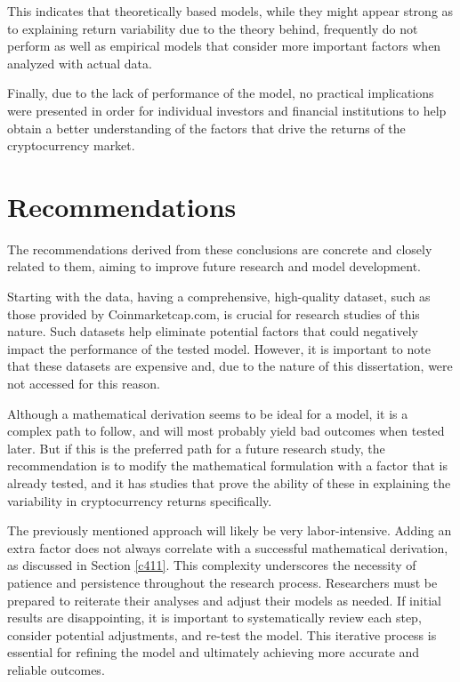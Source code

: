 This indicates that theoretically based models, while they might appear strong as to explaining return variability due to the theory behind, frequently do not perform as well as empirical models that consider more important factors when analyzed with actual data.

Finally, due to the lack of performance of the model, no practical implications were presented in order for individual investors and financial institutions to help obtain a better understanding of the factors that drive the returns of the cryptocurrency market.


\section{Recommendations}
The recommendations derived from these conclusions are concrete and closely related to them, aiming to improve future research and model development.

Starting with the data, having a comprehensive, high-quality dataset, such as those provided by Coinmarketcap.com, is crucial for research studies of this nature. Such datasets help eliminate potential factors that could negatively impact the performance of the tested model. However, it is important to note that these datasets are expensive and, due to the nature of this dissertation, were not accessed for this reason.

Although a mathematical derivation seems to be ideal for a model, it is a complex path to follow, and will most probably yield bad outcomes when tested later. But if this is the preferred path for a future research study, the recommendation is to modify the mathematical formulation with a factor that is already tested, and it has studies that prove the ability of these in explaining the variability in cryptocurrency returns specifically.

The previously mentioned approach will likely be very labor-intensive. Adding an extra factor does not always correlate with a successful mathematical derivation, as discussed in Section \ref{c411}. This complexity underscores the necessity of patience and persistence throughout the research process. Researchers must be prepared to reiterate their analyses and adjust their models as needed. If initial results are disappointing, it is important to systematically review each step, consider potential adjustments, and re-test the model. This iterative process is essential for refining the model and ultimately achieving more accurate and reliable outcomes.




